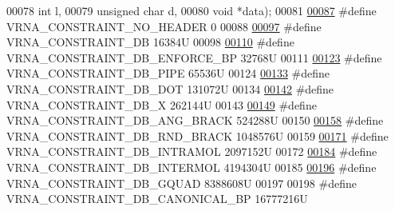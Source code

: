 \begin{DoxyCode}
00078                                                   \textcolor{keywordtype}{int}           l,
00079                                                   \textcolor{keywordtype}{unsigned} \textcolor{keywordtype}{char} d,
00080                                                   \textcolor{keywordtype}{void}          *data);
00081 
\hyperlink{hard_8h_a08d12a9a846ea593b7171d277c9f033f}{00087} \textcolor{preprocessor}{#define VRNA\_CONSTRAINT\_NO\_HEADER         0}
00088 
\hyperlink{group__hard__constraints_ga4bfc2f15c4f261c62a11af9d2aa80c90}{00097} \textcolor{preprocessor}{#define VRNA\_CONSTRAINT\_DB                16384U}
00098 
\hyperlink{group__hard__constraints_ga29ebe940110d60ab798fdacbcdbbfb7d}{00110} \textcolor{preprocessor}{#define VRNA\_CONSTRAINT\_DB\_ENFORCE\_BP           32768U}
00111 
\hyperlink{group__hard__constraints_ga13053547a2de5532b64b64d35e097ae1}{00123} \textcolor{preprocessor}{#define VRNA\_CONSTRAINT\_DB\_PIPE              65536U}
00124 
\hyperlink{group__hard__constraints_ga369bea82eae75fbe626f409fa425747e}{00133} \textcolor{preprocessor}{#define VRNA\_CONSTRAINT\_DB\_DOT               131072U}
00134 
\hyperlink{group__hard__constraints_ga7283bbe0f8954f7b030ecc3f2d1932b2}{00142} \textcolor{preprocessor}{#define VRNA\_CONSTRAINT\_DB\_X                 262144U}
00143 
\hyperlink{hard_8h_ad54c1315a47d55653dcaa5de6e544b77}{00149} \textcolor{preprocessor}{#define VRNA\_CONSTRAINT\_DB\_ANG\_BRACK         524288U}
00150 
\hyperlink{group__hard__constraints_gac17b034852c914bc5879954c65d7e74b}{00158} \textcolor{preprocessor}{#define VRNA\_CONSTRAINT\_DB\_RND\_BRACK         1048576U}
00159 
\hyperlink{group__hard__constraints_ga5c17253f5a39d1d49b0fb11f5196982a}{00171} \textcolor{preprocessor}{#define VRNA\_CONSTRAINT\_DB\_INTRAMOL    2097152U}
00172 
\hyperlink{group__hard__constraints_ga31d0ebb9755ca8a4acafc14f00ca755d}{00184} \textcolor{preprocessor}{#define VRNA\_CONSTRAINT\_DB\_INTERMOL    4194304U}
00185 
\hyperlink{group__hard__constraints_ga75cfab03cdc97c95b3ce8bb29f52b08e}{00196} \textcolor{preprocessor}{#define VRNA\_CONSTRAINT\_DB\_GQUAD                8388608U}
00197 
00198 \textcolor{preprocessor}{#define VRNA\_CONSTRAINT\_DB\_CANONICAL\_BP         16777216U}

\end{DoxyCode}
